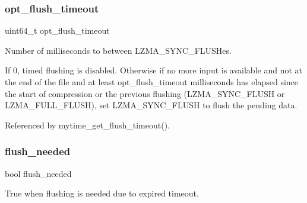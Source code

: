 \subsubsection{opt\+\_\+flush\+\_\+timeout}
{\footnotesize\ttfamily uint64\+\_\+t opt\+\_\+flush\+\_\+timeout}



Number of milliseconds to between L\+Z\+M\+A\+\_\+\+S\+Y\+N\+C\+\_\+\+F\+L\+U\+S\+Hes. 

If 0, timed flushing is disabled. Otherwise if no more input is available and not at the end of the file and at least opt\+\_\+flush\+\_\+timeout milliseconds has elapsed since the start of compression or the previous flushing (L\+Z\+M\+A\+\_\+\+S\+Y\+N\+C\+\_\+\+F\+L\+U\+SH or L\+Z\+M\+A\+\_\+\+F\+U\+L\+L\+\_\+\+F\+L\+U\+SH), set L\+Z\+M\+A\+\_\+\+S\+Y\+N\+C\+\_\+\+F\+L\+U\+SH to flush the pending data. 

Referenced by mytime\+\_\+get\+\_\+flush\+\_\+timeout().

\mbox{\label{mytime_8h_ab6d388eefb45931239a4c197f6f70899}} 
\subsubsection{flush\+\_\+needed}
{\footnotesize\ttfamily bool flush\+\_\+needed}



True when flushing is needed due to expired timeout. 

